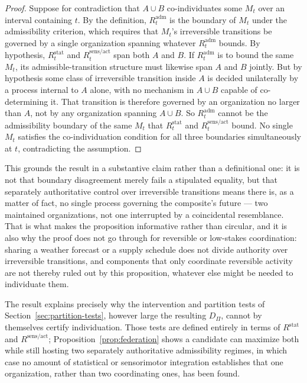 \documentclass[11pt]{article}
\begin{document}
\begin{proof}
Suppose for contradiction that $A\cup B$ co-individuates some $M_t$ over an interval containing $t$. By the definition, $R^{\mathrm{adm}}_t$ is the boundary of $M_t$ under the admissibility criterion, which requires that $M_t$'s irreversible transitions be governed by a single organization spanning whatever $R^{\mathrm{adm}}_t$ bounds. By hypothesis, $R^{\mathrm{stat}}_t$ and $R^{\mathrm{sens/act}}_t$ span both $A$ and $B$. If $R^{\mathrm{adm}}_t$ is to bound the same $M_t$, its admissible-transition structure must likewise span $A$ and $B$ jointly. But by hypothesis some class of irreversible transition inside $A$ is decided unilaterally by a process internal to $A$ alone, with no mechanism in $A\cup B$ capable of co-determining it. That transition is therefore governed by an organization no larger than $A$, not by any organization spanning $A\cup B$. So $R^{\mathrm{adm}}_t$ cannot be the admissibility boundary of the same $M_t$ that $R^{\mathrm{stat}}_t$ and $R^{\mathrm{sens/act}}_t$ bound. No single $M_t$ satisfies the co-individuation condition for all three boundaries simultaneously at $t$, contradicting the assumption.
\end{proof}

This grounds the result in a substantive claim rather than a definitional one: it is not that boundary disagreement merely fails a stipulated equality, but that separately authoritative control over irreversible transitions means there is, as a matter of fact, no single process governing the composite's future --- two maintained organizations, not one interrupted by a coincidental resemblance. That is what makes the proposition informative rather than circular, and it is also why the proof does not go through for reversible or low-stakes coordination: sharing a weather forecast or a supply schedule does not divide authority over irreversible transitions, and components that only coordinate reversible activity are not thereby ruled out by this proposition, whatever else might be needed to individuate them.

The result explains precisely why the intervention and partition tests of Section~\ref{sec:partition-tests}, however large the resulting $D_\Pi$, cannot by themselves certify individuation. Those tests are defined entirely in terms of $R^{\mathrm{stat}}$ and $R^{\mathrm{sens/act}}$; Proposition~\ref{prop:federation} shows a candidate can maximize both while still hosting two separately authoritative admissibility regimes, in which case no amount of statistical or sensorimotor integration establishes that one organization, rather than two coordinating ones, has been found.
\end{document}
